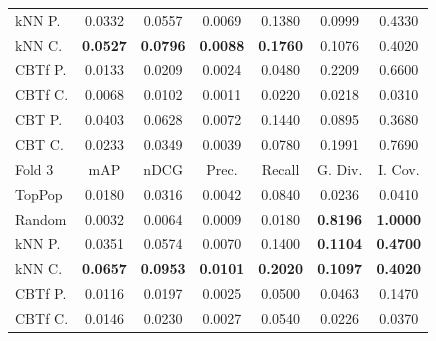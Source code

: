 \begin{table}[hbt]
\begin{tabulary}{\textwidth}{|L|CCCCCC|}
kNN P. & 0.0332 &           0.0557 &           0.0069 &           0.1380 &                                            0.0999 &                                            0.4330 \\
kNN C. & \textbf{0.0527} &  \textbf{0.0796} &  \textbf{0.0088} &  \textbf{0.1760} &                                            0.1076 &                                            0.4020 \\
CBTf P. & 0.0133 &           0.0209 &           0.0024 &           0.0480 &                                            0.2209 &                                            0.6600 \\
CBTf C. & 0.0068 &           0.0102 &           0.0011 &           0.0220 &                                            0.0218 &                                            0.0310 \\
CBT P. & 0.0403 &           0.0628 &           0.0072 &           0.1440 &                                            0.0895 &                                            0.3680 \\
CBT C. & 0.0233 &           0.0349 &           0.0039 &           0.0780 &                                            0.1991 &                                            0.7690 \\
\hline
\hline
Fold 3 & mAP & nDCG & Prec. & Recall & G. Div. & I. Cov. \\
\hline
TopPop & 0.0180 &           0.0316 &           0.0042 &           0.0840 &                                            0.0236 &                                            0.0410 \\
Random & 0.0032 &           0.0064 &           0.0009 &           0.0180 &                                   \textbf{0.8196} &                                   \textbf{1.0000} \\
kNN P. & 0.0351 &           0.0574 &           0.0070 &           0.1400 &                                   \textbf{0.1104} &                                   \textbf{0.4700} \\
kNN C. & \textbf{0.0657} &  \textbf{0.0953} &  \textbf{0.0101} &  \textbf{0.2020} &                                   \textbf{0.1097} &                                   \textbf{0.4020} \\
CBTf P. & 0.0116 &           0.0197 &           0.0025 &           0.0500 &                                            0.0463 &                                            0.1470 \\
CBTf C. & 0.0146 &           0.0230 &           0.0027 &           0.0540 &                                            0.0226 &                                            0.0370 \\

\end{tabulary}
\end{table}
